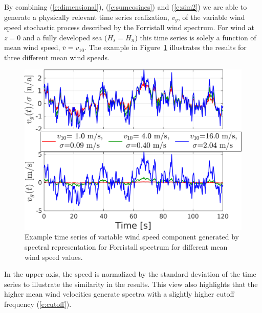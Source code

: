 \documentclass[utf8]{frontiersSCNS} %
\begin{document}
By combining (\ref{e:dimensional}), (\ref{e:sumcosines}) and (\ref{e:sim2}) we are able to generate a physically relevant time series realization, $v_g$, of the variable wind speed stochastic process described by the Forristall wind spectrum.  For wind at $z=0$ and a fully developed sea ($H_s=H_n$) this time series is solely a function of mean wind speed, $\bar{v}=v_{10}$. The example in Figure~\ref{f:forristall} illustrates the results for three different mean wind speeds.
\begin{figure}[h!]
  \centering
  \includegraphics[width=\SFc\textwidth]{src/foristall_time_ex.png}
  \caption{Example time series of variable wind speed component generated by spectral representation for Forristall spectrum for different mean wind speed values.}
  \label{f:forristall}
\end{figure}
In the upper axis, the speed is normalized by the standard deviation of the time series to illustrate the similarity in the results. This view also highlights that the higher mean wind velocities generate spectra with a slightly higher cutoff frequency (\ref{e:cutoff}).
%
\end{document}

